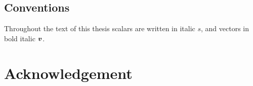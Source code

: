 \documentclass[10pt, DIV=10, headtopline=0.08em, headsepline=0.04em, headinclude, BCOR=6mm]{scrbook}
\begin{document}

%
\frontmatter

%

%
{\hypersetup{hidelinks}\tableofcontents}%

\clearpage
{}
\printglossaries

%
%


\section*{Conventions}
Throughout the text of this thesis scalars are written in italic $s$, and vectors in bold italic $\vb*{v}$.
\nonfrenchspacing

%
\mainmatter
\renewcommand{\thechapter}{\Roman{chapter}}



%
\cleardoublepage
{}
{}
\printbibliography

\backmatter

\chapter*{Acknowledgement}

%
%
\end{document}
